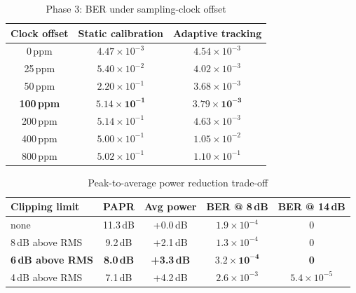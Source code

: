 \documentclass[11pt,a4paper]{report}
\begin{document}
\begin{table}[htbp]
\centering
\small
\begin{tabular}{|c|c|c|}
\hline
\textbf{Clock offset} & \textbf{Static calibration} & \textbf{Adaptive tracking} \\
\hline
0\,ppm & $4.47\times10^{-3}$ & $4.54\times10^{-3}$ \\
25\,ppm & $5.40\times10^{-2}$ & $4.02\times10^{-3}$ \\
50\,ppm & $2.20\times10^{-1}$ & $3.68\times10^{-3}$ \\
\textbf{100\,ppm} & $\mathbf{5.14\times10^{-1}}$ & $\mathbf{3.79\times10^{-3}}$ \\
200\,ppm & $5.14\times10^{-1}$ & $4.63\times10^{-3}$ \\
400\,ppm & $5.00\times10^{-1}$ & $1.05\times10^{-2}$ \\
800\,ppm & $5.02\times10^{-1}$ & $1.10\times10^{-1}$ \\
\hline
\end{tabular}
\caption{Phase 3: BER under sampling-clock offset}
\end{table}

\begin{table}[htbp]
\centering
\small
\begin{tabular}{|l|c|c|c|c|}
\hline
\textbf{Clipping limit} & \textbf{PAPR} & \textbf{Avg power} & \textbf{BER @ 8\,dB} & \textbf{BER @ 14\,dB} \\
\hline
none & 11.3\,dB & +0.0\,dB & $1.9\times10^{-4}$ & 0 \\
8\,dB above RMS & 9.2\,dB & +2.1\,dB & $1.3\times10^{-4}$ & 0 \\
\textbf{6\,dB above RMS} & \textbf{8.0\,dB} & \textbf{+3.3\,dB} & $\mathbf{3.2\times10^{-4}}$ & \textbf{0} \\
4\,dB above RMS & 7.1\,dB & +4.2\,dB & $2.6\times10^{-3}$ & $5.4\times10^{-5}$ \\
\hline
\end{tabular}
\caption{Peak-to-average power reduction trade-off}
\label{tab:papr}
\end{table}
\end{document}
